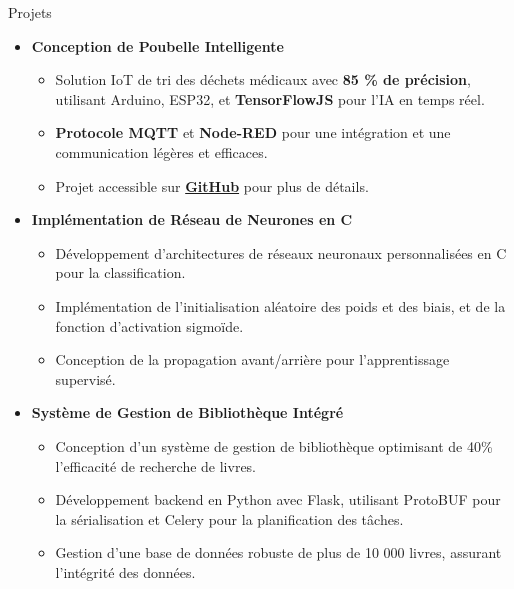 \documentclass{resume}
\begin{document}
    \begin{rSection}{Projets}
        \vspace{-0.25em}
        \newcommand\tab[1][1cm]{\hspace*{#1}}
    \begin{itemize}[leftmargin=*,label= ]
        \setlength{\itemsep}{-6pt}
        \item \textbf{\large Conception de Poubelle Intelligente}
        \begin{itemize}
            \setlength{\itemsep}{-6pt}
            \item Solution IoT de tri des déchets médicaux avec \textbf{85 \% de précision}, utilisant Arduino, ESP32, et \textbf{TensorFlowJS} pour l'IA en temps réel.
            \item \textbf{Protocole MQTT} et \textbf{Node-RED} pour une intégration et une communication légères et efficaces.
            \item Projet accessible sur \href{https://github.com/evry-paris-saclay/2023-m2cns-rd-ChaineDeValeurs}{\textbf{GitHub}} pour plus de détails.
        \end{itemize}
            
        
        \item \textbf{\large Implémentation de Réseau de Neurones en C} 
        \begin{itemize}
            \setlength{\itemsep}{-6pt} %
            \item Développement d'architectures de réseaux neuronaux personnalisées en C pour la classification.
            \item Implémentation de l'initialisation aléatoire des poids et des biais, et de la fonction d'activation sigmoïde.
            \item Conception de la propagation avant/arrière pour l'apprentissage supervisé.
        \end{itemize}
        
        \item \textbf{\large Système de Gestion de Bibliothèque Intégré}
        \begin{itemize}
            \setlength{\itemsep}{-6pt} %
            \item Conception d'un système de gestion de bibliothèque optimisant de 40\% l'efficacité de recherche de livres.
            \item Développement backend en Python avec Flask, utilisant ProtoBUF pour la sérialisation et Celery pour la planification des tâches.
            \item Gestion d'une base de données robuste de plus de 10 000 livres, assurant l'intégrité des données.
        \end{itemize}
        

\end{itemize}
\end{rSection}
\end{document}
